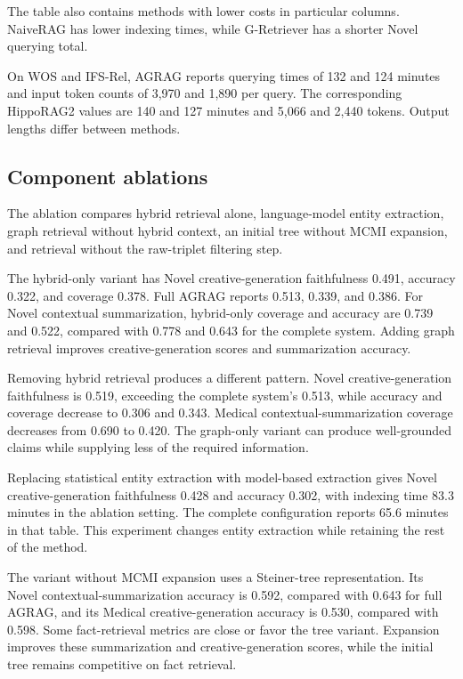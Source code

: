 The table also contains methods with lower costs in particular columns. NaiveRAG has lower indexing times, while G-Retriever has a shorter Novel querying total.

On WOS and IFS-Rel, AGRAG reports querying times of 132 and 124 minutes and input token counts of 3,970 and 1,890 per query. The corresponding HippoRAG2 values are 140 and 127 minutes and 5,066 and 2,440 tokens. Output lengths differ between methods.

\subsection{Component ablations}

The ablation compares hybrid retrieval alone, language-model entity extraction, graph retrieval without hybrid context, an initial tree without MCMI expansion, and retrieval without the raw-triplet filtering step.

The hybrid-only variant has Novel creative-generation faithfulness 0.491, accuracy 0.322, and coverage 0.378. Full AGRAG reports 0.513, 0.339, and 0.386. For Novel contextual summarization, hybrid-only coverage and accuracy are 0.739 and 0.522, compared with 0.778 and 0.643 for the complete system. Adding graph retrieval improves creative-generation scores and summarization accuracy.

Removing hybrid retrieval produces a different pattern. Novel creative-generation faithfulness is 0.519, exceeding the complete system's 0.513, while accuracy and coverage decrease to 0.306 and 0.343. Medical contextual-summarization coverage decreases from 0.690 to 0.420. The graph-only variant can produce well-grounded claims while supplying less of the required information.

Replacing statistical entity extraction with model-based extraction gives Novel creative-generation faithfulness 0.428 and accuracy 0.302, with indexing time 83.3 minutes in the ablation setting. The complete configuration reports 65.6 minutes in that table. This experiment changes entity extraction while retaining the rest of the method.

The variant without MCMI expansion uses a Steiner-tree representation. Its Novel contextual-summarization accuracy is 0.592, compared with 0.643 for full AGRAG, and its Medical creative-generation accuracy is 0.530, compared with 0.598. Some fact-retrieval metrics are close or favor the tree variant. Expansion improves these summarization and creative-generation scores, while the initial tree remains competitive on fact retrieval.


